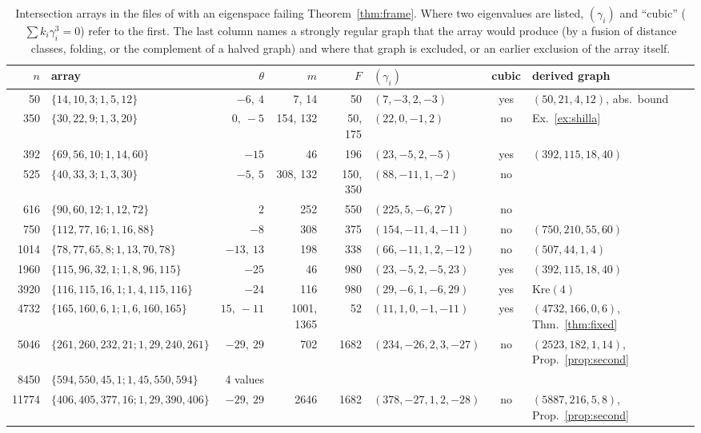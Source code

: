 \documentclass[11pt]{article}
\theoremstyle{definition}
\theoremstyle{remark}
\newcommand{\Kre}{\mathrm{Kre}}
\begin{document}
\begin{table}[H]\scriptsize\centering
\caption{Intersection arrays in the files of \cite{DRGtab} with an eigenspace
failing Theorem~\ref{thm:frame}. Where two eigenvalues are listed, $(\gamma_i)$ and
``cubic'' ($\sum k_i\gamma_i^3=0$) refer to the first. The last column names a
strongly regular graph that the array would produce (by a fusion of distance
classes, folding, or the complement of a halved graph) and where that graph
is excluded, or an earlier exclusion of the array itself.}\label{tab:drg}
\setlength{\tabcolsep}{1.7pt}
\begin{tabular}{rlrrrlcl}\toprule
$n$&array&$\theta$&$m$&$F$&$(\gamma_i)$&cubic&derived graph\\\midrule
50&$\{14,10,3;1,5,12\}$&$-6,\ 4$&7, 14&50&$(7,-3,2,-3)$&yes&$(50,21,4,12)$, abs.\ bound\\
350&$\{30,22,9;1,3,20\}$&$0,\ -5$&154, 132&50, 175&$(22,0,-1,2)$&no&Ex.~\ref{ex:shilla}\\
392&$\{69,56,10;1,14,60\}$&$-15$&46&196&$(23,-5,2,-5)$&yes&$(392,115,18,40)$\\
525&$\{40,33,3;1,3,30\}$&$-5,\ 5$&308, 132&150, 350&$(88,-11,1,-2)$&no&\\
616&$\{90,60,12;1,12,72\}$&$2$&252&550&$(225,5,-6,27)$&no&\cite[Thm.~4.4.4]{BCN}\\
750&$\{112,77,16;1,16,88\}$&$-8$&308&375&$(154,-11,4,-11)$&no&$(750,210,55,60)$ \cite{Koval}\\
1014&$\{78,77,65,8;1,13,70,78\}$&$-13,\ 13$&198&338&$(66,-11,1,2,-12)$&no&$(507,44,1,4)$ \cite{Koval}\\
1960&$\{115,96,32,1;1,8,96,115\}$&$-25$&46&980&$(23,-5,2,-5,23)$&yes&$(392,115,18,40)$\\
3920&$\{116,115,16,1;1,4,115,116\}$&$-24$&116&980&$(29,-6,1,-6,29)$&yes&$\Kre(4)$\\
4732&$\{165,160,6,1;1,6,160,165\}$&$15,\ -11$&1001, 1365&52&$(11,1,0,-1,-11)$&yes&$(4732,166,0,6)$, Thm.~\ref{thm:fixed}\\
5046&$\{261,260,232,21;1,29,240,261\}$&$-29,\ 29$&702&1682&$(234,-26,2,3,-27)$&no&$(2523,182,1,14)$, Prop.~\ref{prop:second}\\
8450&$\{594,550,45,1;1,45,550,594\}$&4 values&&&&&\cite{CW}\\
11774&$\{406,405,377,16;1,29,390,406\}$&$-29,\ 29$&2646&1682&$(378,-27,1,2,-28)$&no&$(5887,216,5,8)$, Prop.~\ref{prop:second}\\
\bottomrule
\end{tabular}
\end{table}
\end{document}
